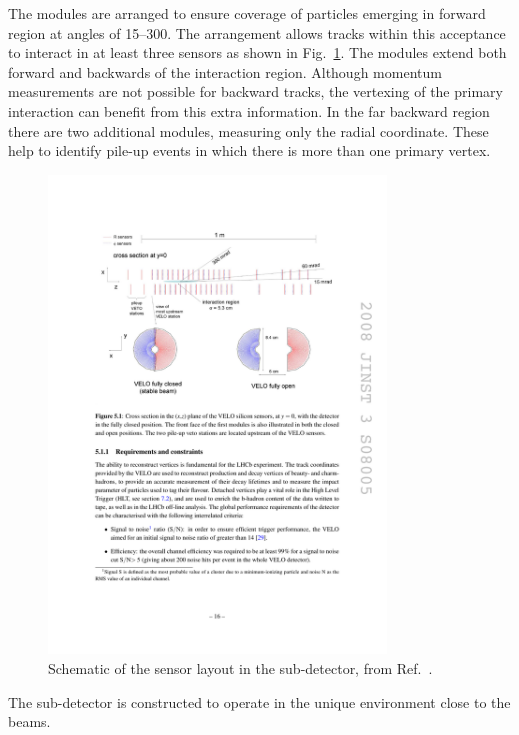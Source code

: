 The \velo modules are arranged to ensure coverage of particles emerging in forward region at angles of 15--300\mrad. The arrangement allows tracks within this acceptance to interact in at least three sensors as shown in Fig.~\ref{fig:Dec_velo_sensor_layout}.   
The modules extend both forward and backwards of the interaction region. Although momentum measurements are not possible for backward tracks, the vertexing of the primary interaction can benefit from this extra information. In the far backward region there are two additional modules, measuring only the radial coordinate. These help to identify pile-up events in which there is more than one primary vertex. 

\begin{figure}[!h]
    \centering
    \includegraphics[width=0.8\textwidth]{figs/Detector/velo_sensor_layout.pdf}
    \caption{Schematic of the sensor layout in the \velo sub-detector, from Ref.~\cite{LHCb-DP-2014-001}.}
    \label{fig:Dec_velo_sensor_layout}   
\end{figure}

The \velo sub-detector is constructed to operate in the unique environment close to the \lhc beams.

